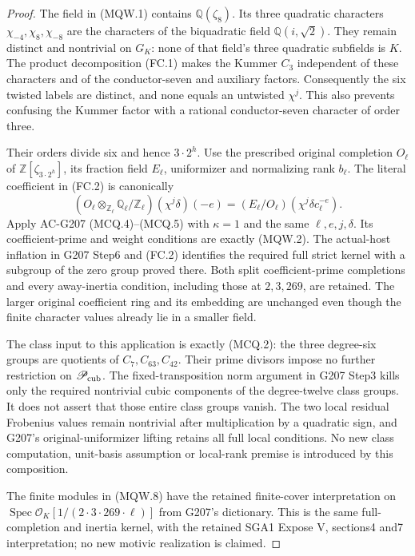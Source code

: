 \begin{proof}
The field in (MQW.1) contains $\mathbb Q(\zeta_8)$.
Its three quadratic characters $\chi_{-4},\chi_8,\chi_{-8}$
are the characters of the biquadratic field $\mathbb Q(i,\sqrt2)$.
They remain distinct and nontrivial on $G_K$: none of that
field's three quadratic subfields is $K$.
The product decomposition (FC.1) makes the Kummer $C_3$
independent of these characters and of the conductor-seven
and auxiliary factors. Consequently the six twisted labels
are distinct, and none equals an untwisted $\chi^j$.
This also prevents confusing the Kummer factor with a rational
conductor-seven character of order three.

Their orders divide six and hence $3\cdot2^h$.
Use the prescribed original completion $O_\ell$ of
$\mathbb Z[\zeta_{3\cdot2^h}]$, its fraction field $E_\ell$,
uniformizer and normalizing rank $b_\ell$.
The literal coefficient in (FC.2) is canonically
\[
 (O_\ell\otimes_{\mathbb Z_\ell}\mathbb Q_\ell/\mathbb Z_\ell)
                         (\chi^j\delta)(-e)
       =(E_\ell/O_\ell)(\chi^j\delta c_\ell^{-e}).
 \tag{MQW.8}
\]
Apply AC-G207 (MCQ.4)--(MCQ.5) with $\kappa=1$ and the
same $\ell,e,j,\delta$. Its coefficient-prime and weight
conditions are exactly (MQW.2). The actual-host inflation
in G207 Step6 and (FC.2) identifies the required full strict
kernel with a subgroup of the zero group proved there.
Both split coefficient-prime completions and every away-inertia
condition, including those at $2,3,269$, are retained.
The larger original coefficient ring and its embedding are
unchanged even though the finite character values already
lie in a smaller field.

The class input to this application is exactly (MCQ.2):
the three degree-six groups are quotients of $C_7,C_{63},C_{42}$.
Their prime divisors impose no further restriction on
$\mathscr P_{\rm cub}$. The fixed-transposition norm argument
in G207 Step3 kills only the required nontrivial cubic
components of the degree-twelve class groups.
It does not assert that those entire class groups vanish.
The two local residual Frobenius values remain nontrivial
after multiplication by a quadratic sign, and G207's
original-uniformizer lifting retains all full local conditions.
No new class computation, unit-basis assumption or local-rank
premise is introduced by this composition.

The finite modules in (MQW.8) have the retained finite-cover
interpretation on
$\operatorname{Spec}\mathcal O_K[1/(2\cdot3\cdot269\cdot\ell)]$
from G207's dictionary. This is the same full-completion and
inertia kernel, with the retained SGA1 Expose V, sections4 and7
interpretation; no new motivic realization is claimed.


\end{proof}
